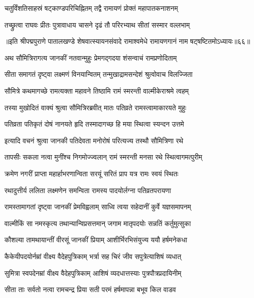 \twolineshloka
{चतुर्विंशतिसाहस्रं षट्काण्डपरिचिह्नितम्}
{तद्वै रामायणं प्रोक्तं महापातकनाशनम्}%

\twolineshloka
{तच्छ्रुत्वा राघवः प्रीतः पुत्रावाधाय चासने}
{दृढं तौ परिरभ्याथ सीतां सस्मार वल्लभाम्}%

{॥इति श्रीपद्मपुराणे पातालखण्डे शेषवात्स्यायनसंवादे रामाश्वमेधे रामायणगानं नाम षट्षष्टितमोऽध्यायः॥६६॥}



\twolineshloka
{अथ सौमित्रिरागत्य जानकीं नतवान्मुहुः}
{प्रेमगद्गदया शंसन्वाचं रामप्रणोदिताम्}%

\twolineshloka
{सीता समागतं दृष्ट्वा लक्ष्मणं विनयान्वितम्}
{तन्मुखाद्रामसन्देशं श्रुत्वोवाच विलज्जिता}%

\twolineshloka
{सौमित्रे कथमागच्छे रामत्यक्ता महावने}
{तिष्ठामि रामं स्मरन्ती वाल्मीकेराश्रमे त्वहम्}%

\twolineshloka
{तस्या मुखोदितं वाक्यं श्रुत्वा सौमित्रिरब्रवीत्}
{मातः पतिव्रते रामस्त्वामाकारयते मुहुः}%

\twolineshloka
{पतिव्रता पतिकृतं दोषं नानयते हृदि}
{तस्मादागच्छ हि मया स्थित्वा स्यन्दन उत्तमे}%

\twolineshloka
{इत्यादि वचनं श्रुत्वा जानकी पतिदेवता}
{मनोरोषं परित्यज्य तस्थौ सौमित्रिणा रथे}%

\twolineshloka
{तापसीः सकला नत्वा मुनींश्च निगमोज्ज्वलान्}
{रामं स्मरन्ती मनसा रथे स्थित्वागमत्पुरीम्}%

\twolineshloka
{क्रमेण नगरीं प्राप्ता महार्हाभरणान्विता}
{सरयूं सरितं प्राप यत्र रामः स्वयं स्थितः}%

\twolineshloka
{रथादुत्तीर्य ललिता लक्ष्मणेन समन्विता}
{रामस्य पादयोर्लग्ना पतिव्रतपरायणा}%

\twolineshloka
{रामस्तामागतां दृष्ट्वा जानकीं प्रेमविह्वलाम्}
{साध्वि त्वया सहेदानीं कुर्वे यज्ञसमापनम्}%

\twolineshloka
{वाल्मीकिं सा नमस्कृत्य तथान्यान्विप्रसत्तमान्}
{जगाम मातृपदयोः सन्नतिं कर्तुमुत्सुका}%

\twolineshloka
{कौशल्या तामथायान्तीं वीरसूं जानकीं प्रियाम्}
{आशीर्भिरभिसंयुज्य ययौ हर्षमनेकधा}%

\twolineshloka
{कैकेयीपदयोर्नम्रां वीक्ष्य वैदेहपुत्रिकाम्}
{भर्त्रा सह चिरं जीव सपुत्रेत्याशिषं व्यधात्}%

\twolineshloka
{सुमित्रा स्वपदेनम्रां वीक्ष्य वैदेहपुत्रिकाम्}
{आशिषं व्यदधात्तस्याः पुत्रपौत्रप्रदायिनीम्}%

\twolineshloka
{सीता ताः सर्वतो नत्वा रामचन्द्र प्रिया सती}
{परमं हर्षमापन्ना बभूव किल वाडव}%

